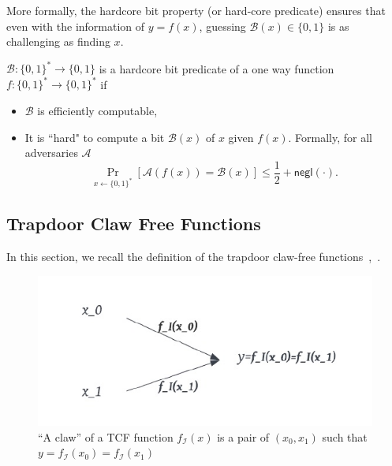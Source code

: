 \noindent More formally, the hardcore bit property (or hard-core predicate) ensures that even with the information of $y=f(x)$, guessing $\mathcal{B}(x)\in\{0,1\}$ is as challenging as finding $x$. 

\begin{defn}
    $\mathcal{B}:\{0,1\}^*\to\{0,1\}$ is a hardcore bit predicate of a one way function $f:\{0,1\}^*\to\{0,1\}^*$ if
    \begin{itemize}
        \item $\mathcal{B}$ is efficiently computable,
        \item It is “hard" to compute a bit $\mathcal{B}(x)$ of $x$ given $f(x)$. Formally, for all adversaries $\mathcal{A}$
        $$\Pr_{x\gets\{0,1\}^*}[\mathcal{A}(f(x))=\mathcal{B}(x)]\leq \displaystyle\frac{1}{2}+\mathsf{negl}(\cdot).$$
    \end{itemize}
\end{defn}


\subsection{Trapdoor Claw Free Functions}

In this section, we recall the definition of the trapdoor claw-free functions~\cite{GRM85},~\cite{Brakerski18_Interactiveproofofquantumness}.

\begin{figure}[!htb]
	\centering
	\includegraphics[]{figures/TCF.pdf}
	\caption{``A claw'' of a TCF function $f_{\mathcal{I}}(x)$ is a pair of $(x_0,x_1)$ such that $y=f_{\mathcal{I}}(x_0)=f_{\mathcal{I}}(x_1)$}\label{fig:TCF}
\end{figure}



